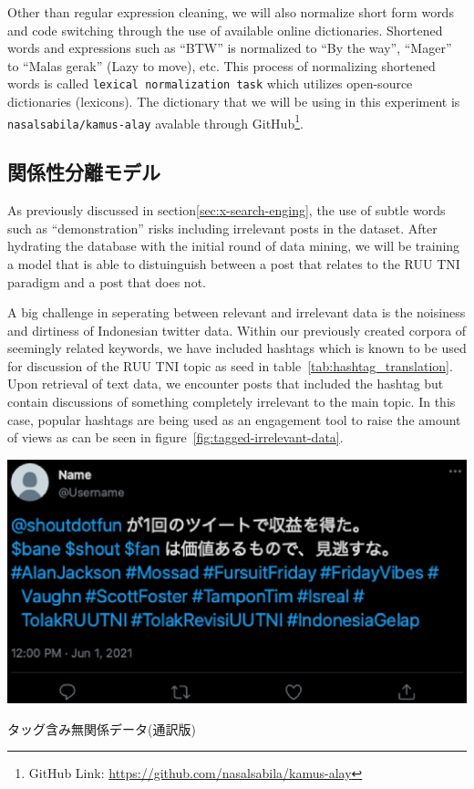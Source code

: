 \documentclass{jabstract}
\begin{document}
\begin{multicols}{2}
Other than regular expression cleaning, we will also normalize short form words and code switching through the use of available online dictionaries. Shortened words and expressions such as ``BTW'' is normalized to ``By the way'', ``Mager'' to ``Malas gerak'' (Lazy to move), etc. This process of normalizing shortened words is called \texttt{lexical normalization task} which utilizes open-source dictionaries (lexicons)\cite{han-baldwin-2011-lexical}. The dictionary that we will be using in this experiment is \texttt{nasalsabila/kamus-alay} avalable through GitHub\footnote{GitHub Link: \url{https://github.com/nasalsabila/kamus-alay}}\cite{8629151}.

\subsection{関係性分離モデル}
As previously discussed in section\ref{sec:x-search-enging}, the use of subtle words such as ``demonstration'' risks including irrelevant posts in the dataset. After hydrating the database with the initial round of data mining, we will be training a model that is able to distuinguish between a post that relates to the RUU TNI paradigm and a post that does not.

A big challenge in seperating between relevant and irrelevant data is the noisiness and dirtiness of Indonesian twitter data. Within our previously created corpora of seemingly related keywords, we have included hashtags which is known to be used for discussion of the RUU TNI topic as seed in table~\ref{tab:hashtag_translation}. Upon retrieval of text data, we encounter posts that included the hashtag but contain discussions of something completely irrelevant to the main topic. In this case, popular hashtags are being used as an engagement tool to raise the amount of views as can be seen in figure~\ref{fig:tagged-irrelevant-data}.\\

\begin{figurehere}
  \centering
  \includegraphics[width=0.9\linewidth]{hashtag_unrelated.eps}
  \caption{タッグ含み無関係データ(通訳版)}\label{fig:tagged-irrelevant-data}
\end{figurehere}


\end{multicols}
\end{document}
